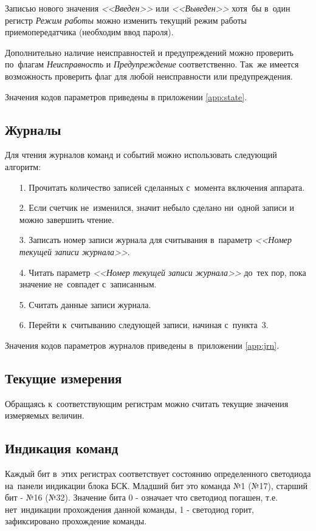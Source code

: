 Записью нового значения \textit{<<Введен>>} или \textit{<<Выведен>>} хотя~бы в~один регистр \textit{Режим работы} можно изменить текущий режим работы приемопередатчика (необходим ввод пароля).

Дополнительно наличие неисправностей и предупреждений можно проверить по~флагам \textit{Неисправность} и \textit{Предупреждение} соответственно. Так~же имеется возможность проверить флаг для любой неисправности или предупреждения.

Значения кодов параметров приведены в приложении \ref{app:state}.

\subsection{Журналы}

Для чтения журналов команд и событий можно использовать следующий алгоритм:
\begin{enumerate}
	\item[1.] Прочитать количество записей сделанных с~момента включения аппарата.
\item[2.] Если счетчик не~изменился, значит небыло сделано ни~одной записи и можно завершить чтение.
\item[3.] Записать номер записи журнала для считывания в~параметр \textit{<<Номер текущей записи журнала>>}.
\item[4.] Читать параметр \textit{<<Номер текущей записи журнала>>} до~тех пор, пока значение не~совпадет с~записанным.
\item[5.] Считать данные записи журнала.
\item[6.] Перейти к~считыванию следующей записи, начиная с~пункта~3.
\end{enumerate}

Значения кодов параметров журналов приведены в~приложении \ref{app:jrn}.

\subsection{Текущие измерения}

Обращаясь к~соответствующим регистрам можно считать текущие значения измеряемых величин.

\ifCommand
\subsection{Индикация команд}

Каждый бит в~этих регистрах соответствует состоянию определенного светодиода на~панели индикации блока БСК. Младший бит это команда №1 (№17), старший бит - №16 (№32). Значение бита 0 - означает что светодиод погашен, т.е. нет~индикации прохождения данной команды, 1 - светодиод горит, зафиксировано прохождение команды.

